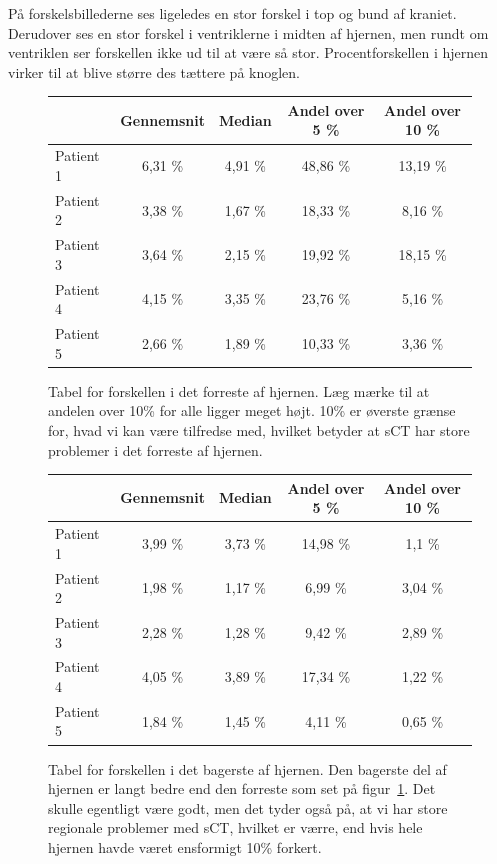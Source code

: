 På forskelsbillederne ses ligeledes en stor forskel i top og bund af
kraniet. Derudover ses en stor forskel i ventriklerne i midten af
hjernen, men rundt om ventriklen ser forskellen ikke ud til at være så
stor. Procentforskellen i hjernen virker til at blive større des tættere
på knoglen.


\begin{figure}
    \centering
    \begin{tabular}{| l | c | c | c | c |}
        \hline
         & Gennemsnit & Median & Andel over 5 \% & Andel over 10 \% \\ \hline
        Patient 1 & 6,31 \% & 4,91 \% & 48,86 \% & 13,19 \% \\ \hline
        Patient 2 & 3,38 \% & 1,67 \% & 18,33 \% & 8,16 \% \\ \hline
        Patient 3 & 3,64 \% & 2,15 \% & 19,92 \% & 18,15 \% \\ \hline
        Patient 4 & 4,15 \% & 3,35 \% & 23,76 \% & 5,16 \% \\ \hline
        Patient 5 & 2,66 \% & 1,89 \% & 10,33 \% & 3,36 \% \\ \hline
    \end{tabular}
    \caption{Tabel for forskellen i det forreste af hjernen. Læg mærke til at andelen over 10\% for alle ligger meget højt. 10\% er øverste grænse for, hvad vi kan være tilfredse med, hvilket betyder at sCT har store problemer i det forreste af hjernen.}
    \label{tab:loocv_forresthjerne}
\end{figure}

\begin{figure}
    \centering
    \begin{tabular}{| l | c | c | c | c |}
        \hline
         & Gennemsnit & Median & Andel over 5 \% & Andel over 10 \% \\ \hline
        Patient 1 & 3,99 \% & 3,73 \% & 14,98 \% & 1,1 \% \\ \hline
        Patient 2 & 1,98 \% & 1,17 \% & 6,99 \% & 3,04 \% \\ \hline
        Patient 3 & 2,28 \% & 1,28 \% & 9,42 \% & 2,89 \% \\ \hline
        Patient 4 & 4,05 \% & 3,89 \% & 17,34 \% & 1,22 \% \\ \hline
        Patient 5 & 1,84 \% & 1,45 \% & 4,11 \% & 0,65 \% \\ \hline
    \end{tabular}
    \caption{Tabel for forskellen i det bagerste af hjernen. Den bagerste del af hjernen er langt bedre end den forreste som set på figur~\ref{tab:loocv_forresthjerne}. Det skulle egentligt være godt, men det tyder også på, at vi har store regionale problemer med sCT, hvilket er værre, end hvis hele hjernen havde været ensformigt 10\% forkert.}
    \label{tab:loocv_bagersthjerne}
\end{figure}

